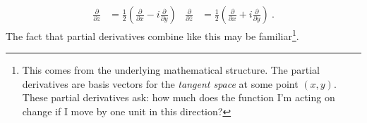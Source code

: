 \begin{align}
	\frac{\partial}{\partial z} &= 
	\frac{1}{2}
	\left(
	\frac{\partial}{\partial x}
	-i
	\frac{\partial}{\partial y}
	\right)
	&
	\frac{\partial}{\partial \bar z} &= 
 	\frac{1}{2}
	\left(
	\frac{\partial}{\partial x}
	+i
	\frac{\partial}{\partial y}
	\right) 
	\ .
	\label{eq:ddz:ddzst}
\end{align}
The fact that partial derivatives combine like this may be familiar\footnote{This comes from the underlying mathematical structure. The partial derivatives are basis vectors for the \emph{tangent space} at some point $(x,y)$. These partial derivatives ask: how much does the function I'm acting on change if I move by one unit in this direction?}. 

